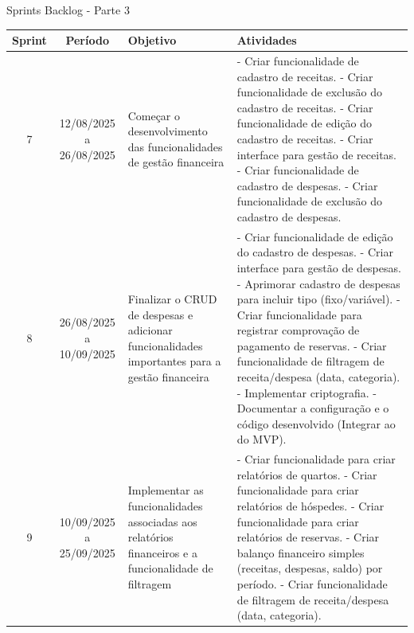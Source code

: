 \documentclass[
	12pt,				%
	openany,			%
	twoside,			%
	a4paper,			%
	english,			%
	french,				%
	spanish,			%
	brazil				%
	]{abntex2}
\begin{document}
\begin{quadro}[H]
	\caption{Sprints Backlog - Parte 3} 
	\label{sprints_backlog_3} 
	\begin{tabular}{|c|c|p{4cm}|p{6cm}|}
		\hline
		\textbf{Sprint} & \textbf{Período} & \textbf{Objetivo} & \textbf{Atividades} \\
		\hline	
		7 & 12/08/2025 a 26/08/2025 & Começar o desenvolvimento das funcionalidades de gestão financeira &
		- Criar funcionalidade de cadastro de receitas. \newline
		- Criar funcionalidade de exclusão do cadastro de receitas. \newline
		- Criar funcionalidade de edição do cadastro de receitas. \newline
		- Criar interface para gestão de receitas. \newline
		- Criar funcionalidade de cadastro de despesas. \newline
		- Criar funcionalidade de exclusão do cadastro de despesas. \\
		\hline
		8 & 26/08/2025 a 10/09/2025 & Finalizar o CRUD de despesas e adicionar funcionalidades importantes para a gestão financeira &
		- Criar funcionalidade de edição do cadastro de despesas. \newline
		- Criar interface para gestão de despesas. \newline
		- Aprimorar cadastro de despesas para incluir tipo (fixo/variável). \newline
		- Criar funcionalidade para registrar comprovação de pagamento de reservas. \newline
		- Criar funcionalidade de filtragem de receita/despesa (data, categoria). \newline
		- Implementar criptografia. \newline
		- Documentar a configuração e o código desenvolvido (Integrar ao do MVP). 	 \\
		\hline		
		9 & 10/09/2025 a 25/09/2025 & Implementar as funcionalidades associadas aos relatórios financeiros e a funcionalidade de filtragem &
		- Criar funcionalidade para criar relatórios de quartos. \newline
		- Criar funcionalidade para criar relatórios de hóspedes. \newline
		- Criar funcionalidade para criar relatórios de reservas. \newline
		- Criar balanço financeiro simples (receitas, despesas, saldo) por período. \newline
		- Criar funcionalidade de filtragem de receita/despesa (data, categoria). \\
		\hline
\end{tabular}
\end{quadro}	
\end{document}

